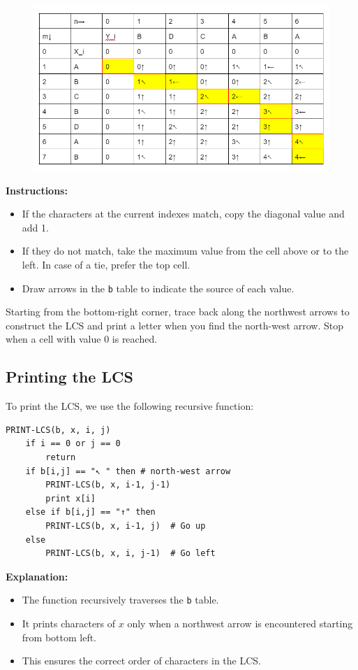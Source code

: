 \begin{figure}[h!]
    \centering
    \includegraphics[width=1\linewidth]{immagini//capitolo 13/13_7.png}
    \label{fig:enter-label}
\end{figure}


\textbf{Instructions:}
\begin{itemize}
    \item If the characters at the current indexes match, copy the diagonal value and add 1.
    \item If they do not match, take the maximum value from the cell above or to the left. In case of a tie, prefer the top cell.
    \item Draw arrows in the \texttt{b} table to indicate the source of each value.
\end{itemize}

Starting from the bottom-right corner, trace back along the northwest arrows to construct the LCS and print a letter when you find the north-west arrow. Stop when a cell with value 0 is reached.

\subsection{Printing the LCS}

To print the LCS, we use the following recursive function:

\begin{verbatim}
PRINT-LCS(b, x, i, j)
    if i == 0 or j == 0
        return
    if b[i,j] == "↖ " then # north-west arrow 
        PRINT-LCS(b, x, i-1, j-1)
        print x[i]
    else if b[i,j] == "↑" then
        PRINT-LCS(b, x, i-1, j)  # Go up
    else
        PRINT-LCS(b, x, i, j-1)  # Go left
\end{verbatim}

\textbf{Explanation:}
\begin{itemize}
    \item The function recursively traverses the \texttt{b} table.
    \item It prints characters of $x$ only when a northwest arrow is encountered starting from bottom left.
    \item This ensures the correct order of characters in the LCS.
\end{itemize}

